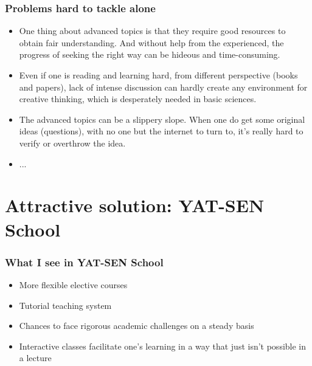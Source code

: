 \documentclass{beamer}
\begin{document}
\begin{frame}
  \frametitle{Problems hard to tackle alone}
  \begin{itemize}
  \item<1-> One thing about advanced topics is that they require good
    resources to obtain fair understanding. And without help from the
    experienced, the progress of seeking the right way can be hideous
    and time-consuming.
  \item<2-> Even if one is reading and learning hard, from different
    perspective (books and papers), lack of intense discussion can
    hardly create any environment for creative thinking, which is
    desperately needed in basic sciences.
  \item<3-> The advanced topics can be a slippery slope. When one do
    get some original ideas (questions), with no one but the internet
    to turn to, it's really hard to verify or overthrow the idea.
  \item<4-> ...
    
  \end{itemize}
  
\end{frame}




\section{Attractive solution: YAT-SEN School}

\begin{frame}
  \frametitle{What I see in YAT-SEN School}

  \begin{itemize}
  \item<1-> More flexible elective courses
  \item<2-> Tutorial teaching system
  \item<3-> Chances to face rigorous academic challenges on a steady
    basis
  \item<4-> Interactive classes facilitate one's learning in a way that
    just isn't possible in a lecture 
  \end{itemize}
\end{frame}
\end{document}

